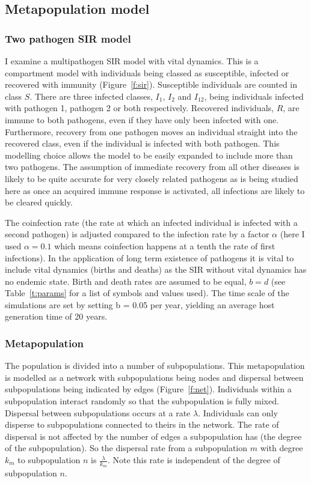 \subsection{Metapopulation model}




\subsubsection{Two pathogen SIR model}

I examine a multipathogen SIR model with vital dynamics. 
This is a compartment model with individuals being classed as susceptible, infected or recovered with immunity (Figure~\ref{f:sir}).
Susceptible individuals are counted in class $S$.
There are three infected classes, $I_1$, $I_2$ and $I_{12}$, being individuals infected with pathogen 1, pathogen 2 or both respectively.
Recovered individuals, $R$, are immune to both pathogens, even if they have only been infected with one.
Furthermore, recovery from one pathogen moves an individual straight into the recovered class, even if the individual is infected with both pathogen.
This modelling choice allows the model to be easily expanded to include more than two pathogens.
The assumption of immediate recovery from all other diseases is likely to be quite accurate for very closely related pathogens as is being studied here as once an acquired immune response is activated, all infections are likely to be cleared quickly.

The coinfection rate (the rate at which an infected individual is infected with a second pathogen) is adjusted compared to the infection rate by a factor $\alpha$ (here I used $\alpha = 0.1$ which means coinfection happens at a tenth the rate of first infections).
In the application of long term existence of pathogens it is vital to include vital dynamics (births and deaths) as the SIR without vital dynamics has no endemic state.
Birth and death rates are assumed to be equal, $b = d$ (see Table~\ref{t:params} for a list of symbols and values used).
The time scale of the simulations are set by setting b = 0.05 per year, yielding an average host generation time of 20 years.


\subsubsection{Metapopulation}


The population is divided into a number of subpopulations.
This metapopulation is modelled as a network with subpopulations being nodes and dispersal between subpopulations being indicated by edges (Figure~\ref{f:net}).
Individuals within a subpopulation interact randomly so that the subpopulation is fully mixed.
Dispersal between subpopulations occurs at a rate $\lambda$.
Individuals can only disperse to subpopulations connected to theirs in the network.
The rate of dispersal is not affected by the number of edges a subpopulation has (the degree of the subpopulation).
So the dispersal rate from a subpopulation $m$ with degree $k_m$ to subpopulation $n$ is $\frac{\lambda}{k_m}$.
Note this rate is independent of the degree of subpopulation $n$.





